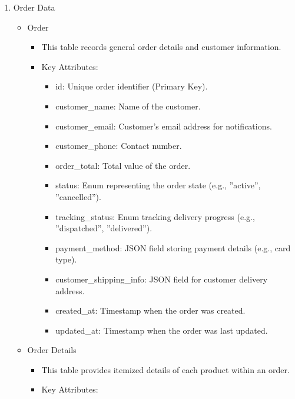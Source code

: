 \documentclass{llncs}
\begin{document}
\begin{enumerate}
    \item Order Data\\
          \begin{itemize}
              \item Order
                    \begin{itemize}
                        \item This table records general order details and customer information.
                        \item Key Attributes:
                              \begin{itemize}
                                  \item id: Unique order identifier (Primary Key).
                                  \item customer\_name: Name of the customer.
                                  \item customer\_email: Customer's email address for notifications.
                                  \item customer\_phone: Contact number.
                                  \item order\_total: Total value of the order.
                                  \item status: Enum representing the order state (e.g., ''active'', ''cancelled'').
                                  \item tracking\_status: Enum tracking delivery progress (e.g., ''dispatched'', ''delivered'').
                                  \item payment\_method: JSON field storing payment details (e.g., card type).
                                  \item customer\_shipping\_info: JSON field for customer delivery address.
                                  \item created\_at: Timestamp when the order was created.
                                  \item updated\_at: Timestamp when the order was last updated.
                              \end{itemize}
                    \end{itemize}
              \item Order Details
                    \begin{itemize}
                        \item This table provides itemized details of each product within an order.
                        \item Key Attributes:

\end{itemize}
\end{itemize}
\end{enumerate}
\end{document}

